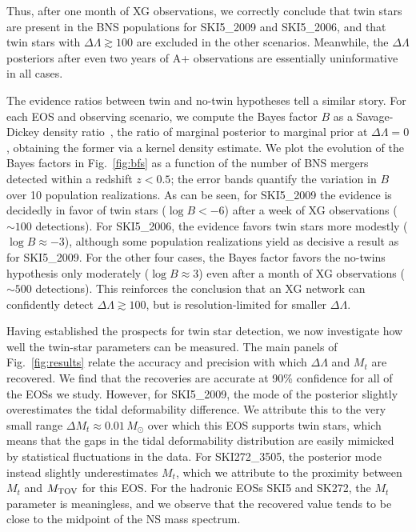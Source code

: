 \documentclass[aps,prl,twocolumn,superscriptaddress,footinbib]{revtex4-1}
\newcommand{\Msun}{\ensuremath{\,M_{\odot}}}
\begin{document}
Thus, after one month of XG observations, we correctly conclude that twin stars are present in the BNS populations for SKI5\_2009 and SKI5\_2006, and that twin stars with $\Delta\Lambda \gtrsim 100$ are excluded in the other scenarios.
Meanwhile, the $\Delta\Lambda$ posteriors after even two years of A+ observations are essentially uninformative in all cases.

The evidence ratios between twin and no-twin hypotheses tell a similar story. For each EOS and observing scenario, we compute the Bayes factor $B$ as a Savage-Dickey density ratio~\cite{Dickey1971}, the ratio of marginal posterior to marginal prior at $\Delta\Lambda = 0$, obtaining the former via a kernel density estimate. We plot the evolution of the Bayes factors in  Fig.~\ref{fig:bfs} as a function of the number of BNS mergers detected within a redshift $z < 0.5$; the error bands quantify the variation in $B$ over 10 population realizations. As can be seen, for SKI5\_2009 the evidence is decidedly in favor of twin stars ($\log{B} < -6$) after a week of XG observations ($\sim100$ detections). For SKI5\_2006, the evidence favors twin stars more modestly ($\log{B} \approx -3$), although some population realizations yield as decisive a result as for SKI5\_2009. For the other four cases, the Bayes factor favors the no-twins hypothesis only moderately ($\log{B} \approx 3$) even after a month of XG observations ($\sim500$ detections). This reinforces the conclusion that an XG network can confidently detect $\Delta\Lambda \gtrsim 100$, but is resolution-limited for smaller $\Delta\Lambda$.

Having established the prospects for twin star detection, we now investigate how well the twin-star parameters can be measured. The main panels of Fig.~\ref{fig:results} relate the accuracy and precision with which $\Delta\Lambda$ and $M_t$ are recovered. 
We find that the recoveries are accurate at 90\% confidence for all of the EOSs we study. However, for SKI5\_2009, the mode of the posterior slightly overestimates the tidal deformability difference. We attribute this to the very small range $\Delta M_t \approx 0.01\Msun$ over which this EOS supports twin stars, which means that the gaps in the tidal deformability distribution are easily mimicked by statistical fluctuations in the data. For SKI272\_3505, the posterior mode instead slightly underestimates $M_t$, which we attribute to the proximity between $M_t$ and $M_{\rm TOV}$ for this EOS.  
For the hadronic EOSs SKI5 and SK272, the $M_t$ parameter is meaningless, and we observe that the recovered value tends to be close to the midpoint of the NS mass spectrum. 
\end{document}

